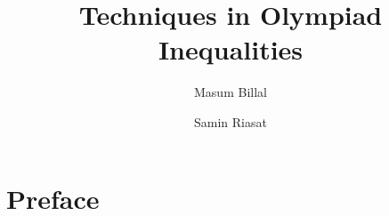 \documentclass[a4paper, 12pt]{book}
\title{\bfseries Techniques in Olympiad Inequalities}
\author{Masum Billal\and Samin Riasat}
\theoremstyle{definition}
\numberwithin{problem}{chapter}
\begin{document}
	\frontmatter
	\maketitle
	\section*{Preface}
	\tableofcontents
	\mainmatter
	
	\begin{refsection}
		
		
		
		
		
		
		\printbibliography
	\end{refsection}
	
	\begin{refsection}
		
		\printbibliography
	\end{refsection}

	\begin{refsection}
		
		\printbibliography
	\end{refsection}

	\begin{refsection}
		
		\printbibliography
	\end{refsection}
	
	\begin{refsection}
		
		\printbibliography
	\end{refsection}

	\begin{refsection}
		
		\printbibliography
	\end{refsection}

	\begin{refsection}
		
		\printbibliography
	\end{refsection}
	
	\begin{refsection}
		
		\printbibliography
	\end{refsection}

	\begin{refsection}
		
		\printbibliography
	\end{refsection}

	\begin{refsection}
		
		\printbibliography
	\end{refsection}

	\begin{refsection}
		
		\printbibliography
	\end{refsection}

	\begin{refsection}
		
		\printbibliography
	\end{refsection}

	\begin{refsection}
		
		\printbibliography
	\end{refsection}

	\begin{refsection}
		
		\printbibliography
	\end{refsection}
	\backmatter
\end{document}
